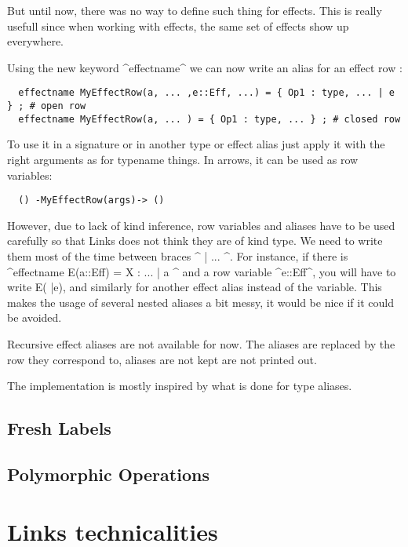 \documentclass[nonacm=true, language=french, language=english]{acmart}
\begin{document}
But until now, there was no way to define such thing for effects. This is really usefull since when working with effects, the same set of effects show up everywhere.

Using the new keyword ^effectname^ we can now write an alias for an effect row :
\begin{lstlisting}
  effectname MyEffectRow(a, ... ,e::Eff, ...) = { Op1 : type, ... | e } ; # open row
  effectname MyEffectRow(a, ... ) = { Op1 : type, ... } ; # closed row
\end{lstlisting}

To use it in a signature or in another type or effect alias just apply it with the right arguments as for typename things. In arrows, it can be used as row variables:
\begin{lstlisting}
  () -MyEffectRow(args)-> ()
\end{lstlisting}

However, due to lack of kind inference, row variables and aliases have to be used carefully so that Links does not think they are of kind type. We need to write them most of the time between braces ^{ | ... }^. For instance, if there is ^effectname E(a::Eff) = {X : ... | a }^ and a row variable ^e::Eff^, you will have to write E({ |e}), and similarly for another effect alias instead of the variable. This makes the usage of several nested aliases a bit messy, it would be nice if it could be avoided.

Recursive effect aliases are not available for now. The aliases are replaced by the row they correspond to, aliases are not kept are not printed out.

The implementation is mostly inspired by what is done for type aliases.

\subsection{Fresh Labels}

\subsection{Polymorphic Operations}








\appendix

\section{Links technicalities}
\label{sec:tech}
\end{document}

